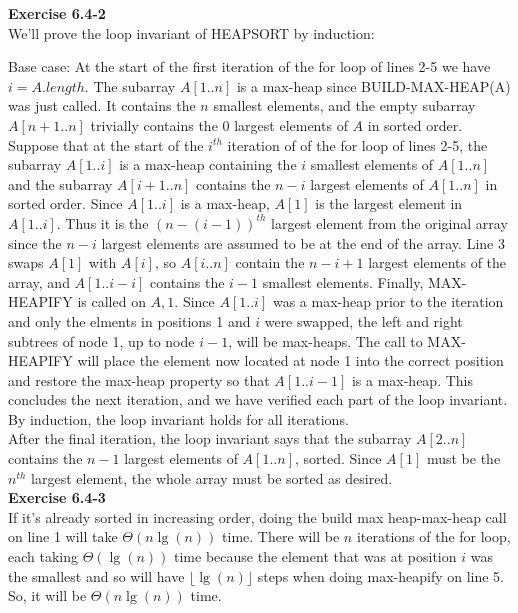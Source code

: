 \documentclass{article}
\begin{document}
\noindent\textbf{Exercise 6.4-2}\\

We'll prove the loop invariant of HEAPSORT by induction:

Base case: At the start of the first iteration of the for loop of lines 2-5 we have $i=A.length$. The subarray $A[1..n]$ is a max-heap since BUILD-MAX-HEAP(A) was just called.  It contains the $n$ smallest elements, and the empty subarray $A[n+1..n]$ trivially contains the 0 largest elements of $A$ in sorted order.\\

Suppose that at the start of the $i^{th}$ iteration of of the for loop of lines 2-5, the subarray $A[1..i]$ is a max-heap containing the $i$ smallest elements of $A[1..n]$ and the subarray $A[i+1..n]$ contains the $n-i$ largest elements of $A[1..n]$ in sorted order. Since $A[1..i]$ is a max-heap, $A[1]$ is the largest element in $A[1..i]$. Thus it is the $(n-(i-1))^{th}$ largest element from the original array since the $n-i$ largest elements are assumed to be at the end of the array.  Line 3 swaps $A[1]$ with $A[i]$, so $A[i..n]$ contain the $n-i+1$ largest elements of the array, and $A[1..i-i]$ contains the $i-1$ smallest elements.  Finally, MAX-HEAPIFY is called on $A,1$.  Since $A[1..i]$ was a max-heap prior to the iteration and only the elments in positions 1 and $i$ were swapped, the left and right subtrees of node 1, up to node $i-1$, will be max-heaps.  The call to MAX-HEAPIFY will place the element now located at node 1 into the correct position and restore the max-heap property so that $A[1..i-1]$ is a max-heap.  This concludes the next iteration, and we have verified each part of the loop invariant.  By induction, the loop invariant holds for all iterations.\\

After the final iteration, the loop invariant says that the subarray $A[2..n]$ contains the $n-1$ largest elements of $A[1..n]$, sorted.  Since $A[1]$ must be the $n^{th}$ largest element, the whole array must be sorted as desired. \\

\noindent\textbf{Exercise 6.4-3}\\

If it's already sorted in increasing order, doing the build max heap-max-heap call on line 1 will take $\Theta(n\lg(n))$ time. There will be $n$ iterations of the for loop, each taking $\Theta(\lg(n))$ time because the element that was at position $i$ was the smallest and so will have $\lfloor \lg(n)\rfloor$ steps when doing max-heapify on line 5. So, it will be $\Theta(n\lg(n))$ time.
\end{document}
